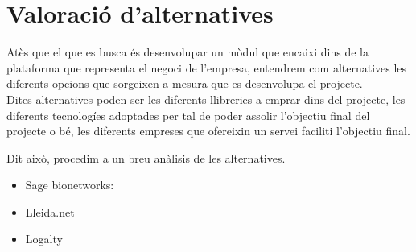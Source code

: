 \section{Valoració d'alternatives}
\label{sec:validacio}
Atès que el que es busca és desenvolupar un mòdul que encaixi dins de la plataforma que representa el negoci de l'empresa, entendrem com alternatives les diferents opcions que sorgeixen a mesura que es desenvolupa el projecte.\\
Dites alternatives poden ser les diferents llibreries a emprar dins del projecte, les diferents tecnologíes adoptades per tal de poder assolir l'objectiu final del projecte o bé, les diferents empreses que ofereixin un servei faciliti l'objectiu final.

Dit això, procedim a un breu anàlisis de les alternatives.
\begin{itemize}
	\item Sage bionetworks:
	\item Lleida.net
	\item Logalty
\end{itemize}